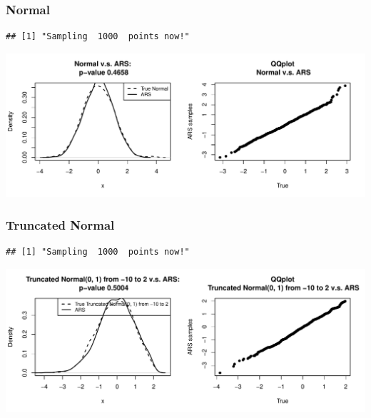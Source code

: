 \documentclass{article}\usepackage[]{graphicx}\usepackage[]{color}
\makeatletter
\def\maxwidth{ %
  \ifdim\Gin@nat@width>\linewidth
    \linewidth
  \else
    \Gin@nat@width
  \fi
}
\newenvironment{kframe}{%
 \def\at@end@of@kframe{}%
 \ifinner\ifhmode%
  \def\at@end@of@kframe{\end{minipage}}%
  \begin{minipage}{\columnwidth}%
 \fi\fi%
 \def\FrameCommand##1{\hskip\@totalleftmargin \hskip-\fboxsep
 \colorbox{shadecolor}{##1}\hskip-\fboxsep
     \hskip-\linewidth \hskip-\@totalleftmargin \hskip\columnwidth}%
 \MakeFramed {\advance\hsize-\width
   \@totalleftmargin\z@ \linewidth\hsize
   \@setminipage}}%
 {\par\unskip\endMakeFramed%
 \at@end@of@kframe}
\newenvironment{knitrout}{}{} %
\makeatother
\begin{document}
\subsubsection{Normal}
\begin{knitrout}
\color{fgcolor}\begin{kframe}
\begin{verbatim}
## [1] "Sampling  1000  points now!"
\end{verbatim}
\end{kframe}
\includegraphics[width=\maxwidth]{figure/normal-1} 

\end{knitrout}

\subsubsection{Truncated Normal}
\begin{knitrout}
\color{fgcolor}\begin{kframe}
\begin{verbatim}
## [1] "Sampling  1000  points now!"
\end{verbatim}
\end{kframe}
\includegraphics[width=\maxwidth]{figure/truncated_normal-1} 

\end{knitrout}
\end{document}

